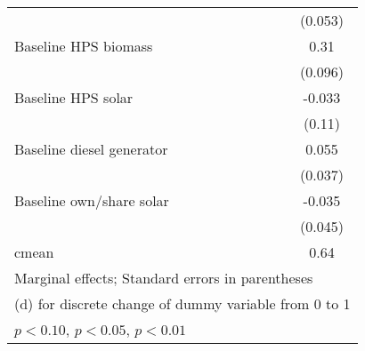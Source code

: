 \begin{table}[htbp]
\begin{tabular*}{1\hsize}{@{\hskip\tabcolsep\extracolsep\fill}l*{5}{c}}
                &                  &                  &                  &                  &  (0.053)         \\
Baseline HPS biomass&                  &                  &                  &                  &     0.31\sym{***}\\
                &                  &                  &                  &                  &  (0.096)         \\
Baseline HPS solar&                  &                  &                  &                  &   -0.033         \\
                &                  &                  &                  &                  &   (0.11)         \\
Baseline diesel generator&                  &                  &                  &                  &    0.055         \\
                &                  &                  &                  &                  &  (0.037)         \\
Baseline own/share solar&                  &                  &                  &                  &   -0.035         \\
                &                  &                  &                  &                  &  (0.045)         \\
\midrule
cmean           &                  &                  &                  &                  &     0.64         \\
\bottomrule
\multicolumn{6}{l}{\footnotesize Marginal effects; Standard errors in parentheses}\\
\multicolumn{6}{l}{\footnotesize  (d) for discrete change of dummy variable from 0 to 1}\\
\multicolumn{6}{l}{\footnotesize \sym{*} \(p<0.10\), \sym{**} \(p<0.05\), \sym{***} \(p<0.01\)}\\
\end{tabular*}
\end{table}
